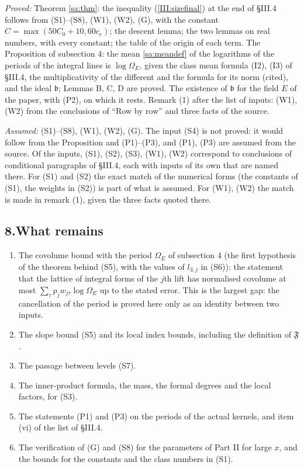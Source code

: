 \documentclass[11pt,letterpaper]{article}
\begin{document}
\emph{Proved:} Theorem \ref{sa:thm}: the inequality (\ref{III:sizefinal}) at the end of \S III.4 follows from
(S1)--(S8), (W1), (W2), (G), with the constant $C=\max(50C_0+10,60c_e)$; the descent lemma; the two
lemmas on real numbers, with every constant; the table of the origin of each term. The Proposition of
subsection 4: the mean \eqref{sa:meandef} of the logarithms of the periods of the integral lines is
$\log\Omega_E$, given the class mean formula (I2), (I3) of \S III.4, the multiplicativity of the
different and the formula for its norm (cited), and the ideal $\mathfrak b$; Lemmas B, C, D are proved.
The existence of $\mathfrak b$ for the field $E$ of the paper, with (P2), on which it rests. Remark (1) after the list of
inputs: (W1), (W2) from the conclusions of ``Row by row'' and three facts of the source.

\emph{Assumed:} (S1)--(S8), (W1), (W2), (G). The input (S4) is not proved: it would follow from the
Proposition and (P1)--(P3), and (P1), (P3) are assumed from the source. Of the inputs, (S1), (S2), (S3),
(W1), (W2) correspond to conclusions of conditional paragraphs of \S III.4, each with inputs of its own
that are named there. For (S1) and (S2) the exact match of the numerical forms (the constants of (S1),
the weights in (S2)) is part of what is assumed. For (W1), (W2) the match is made in remark (1), given
the three facts quoted there.

\subsection*{8.\quad What remains}

\begin{enumerate}[label=\textup{(\roman*)},leftmargin=2.4em,itemsep=2pt,topsep=3pt]
\item The covolume bound with the period $\Omega_E$ of subsection 4 (the first hypothesis of the theorem
behind (S5), with the values of $l_{3,j}$ in (S6)): the statement that the lattice of integral forms of
the $j$th lift has normalised covolume at most $\sum_\tau p_jw_{j\tau}\log\Omega_E$ up to the stated
error. This is the largest gap: the cancellation of the period is proved here only as an identity
between two inputs.
\item The slope bound (S5) and its local index bounds, including the definition of $\mathfrak F$.
\item The passage between levels (S7).
\item The inner-product formula, the mass, the formal degrees and the local factors, for (S3).
\item The statements (P1) and (P3) on the periods of the actual kernels, and item (vi)
of the list of \S III.4.
\item The verification of (G) and (S8) for the parameters of Part II for large $x$, and the bounds for
the constants and the class numbers in (S1).
\end{enumerate}
\end{document}
